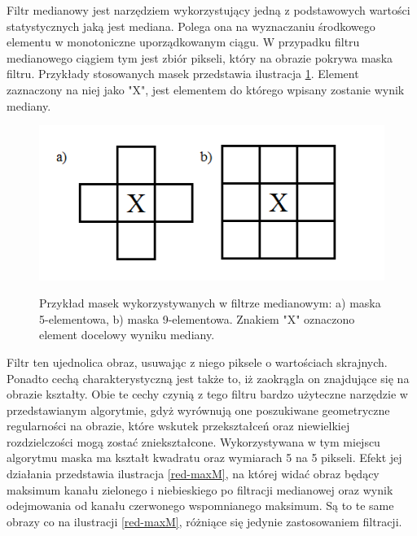 Filtr medianowy jest narzędziem wykorzystujący jedną z podstawowych wartości statystycznych jaką jest mediana. Polega ona na wyznaczaniu środkowego elementu w monotoniczne uporządkowanym ciągu\cite{Malina}. W przypadku filtru medianowego ciągiem tym jest zbiór pikseli, który na obrazie pokrywa maska filtru. Przykłady stosowanych masek przedstawia ilustracja \ref{maski}. Element zaznaczony na niej jako "X", jest elementem do którego wpisany zostanie wynik mediany.\newpage
\begin{figure}[H]
\begin{center}
\includegraphics[scale=0.8]{imgs/maski.png}
\caption[Przykład masek filtru medianowego.]\small{Przykład masek wykorzystywanych w filtrze medianowym: a) maska 5-elementowa, b) maska 9-elementowa. Znakiem "X" oznaczono element docelowy wyniku mediany.}
\label{maski}
\end{center}
\end{figure}
Filtr ten ujednolica obraz, usuwając z niego piksele o wartościach skrajnych. Ponadto cechą charakterystyczną jest także to, iż zaokrągla on znajdujące się na obrazie kształty. Obie te cechy czynią z tego filtru bardzo użyteczne narzędzie w przedstawianym algorytmie, gdyż wyrównują one poszukiwane geometryczne regularności na obrazie, które wskutek przekształceń oraz niewielkiej rozdzielczości mogą zostać zniekształcone. Wykorzystywana w tym miejscu algorytmu maska ma kształt kwadratu oraz wymiarach 5 na 5 pikseli. Efekt jej działania przedstawia ilustracja \ref{red-maxM}, na której widać obraz będący maksimum kanału zielonego i niebieskiego po filtracji medianowej oraz wynik odejmowania od kanału czerwonego wspomnianego maksimum. Są to te same obrazy co na ilustracji \ref{red-maxM}, różniące się jedynie zastosowaniem filtracji.
